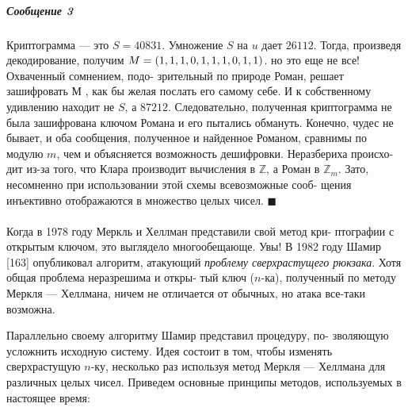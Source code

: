 \subparagraph{Сообщение 3}
Криптограмма — это $S = 40831$. Умножение\linebreak
$S$ на $u$ дает $26112$. Тогда, произведя декодирование, получим $M =\linebreak
(1,1,1,0,1,1,1,0,1,1)$. но это еще не все! Охваченный сомнением, подо­-\linebreak
зрительный по природе Роман, решает зашифровать $М$ , как бы желая\linebreak
послать его самому себе. И к собственному удивлению находит не $S$, а\linebreak
$87 212$. Следовательно, полученная криптограмма не была зашифрована\linebreak
ключом Романа и его пытались обмануть. Конечно, чудес не бывает, и\linebreak
оба сообщения, полученное и найденное Романом, сравнимы по модулю\linebreak
$m$, чем и объясняется возможность дешифровки. Неразбериха происхо­-\linebreak
дит из-за того, что Клара производит вычисления в $\mathbb{Z}$, а Роман в $\mathbb{Z}_m$.\linebreak
Зато, несомненно при использовании этой схемы всевозможные сооб-\linebreak
щения инъективно отображаются в множество целых чисел. $\blacksquare$
\paragraph{}
Когда в 1978 году Меркль и Хеллман представили свой метод кри­-\linebreak
птографии с открытым ключом, это выглядело многообещающе. Увы!\linebreak
В 1982 году Шамир [163] опубликовал алгоритм, атакующий \textit{проблему\linebreak
сверхрастущего рюкзака}. Хотя общая проблема неразрешима и откры­-\linebreak
тый ключ ($n$-ка), полученный по методу Меркля — Хеллмана, ничем\linebreak
не отличается от обычных, но атака все-таки возможна.

Параллельно своему алгоритму Шамир представил процедуру, по-\linebreak­
зволяющую усложнить исходную систему. Идея состоит в том, чтобы\linebreak
изменять сверхрастущую $n$-ку, несколько раз используя метод Меркля\linebreak
--- Хеллмана для различных целых чисел. Приведем основные принципы\linebreak
методов, используемых в настоящее время:

